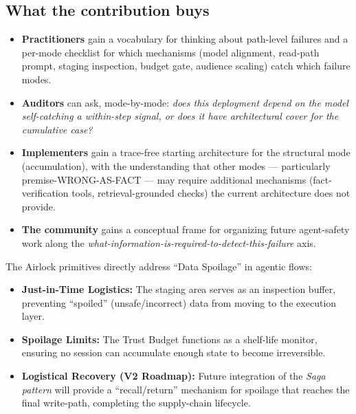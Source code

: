 \documentclass[11pt]{article}
\begin{document}
\subsection{What the contribution buys}

\begin{itemize}[leftmargin=*]
\item \textbf{Practitioners} gain a vocabulary for thinking about path-level failures and a per-mode checklist for which mechanisms (model alignment, read-path prompt, staging inspection, budget gate, audience scaling) catch which failure modes.
\item \textbf{Auditors} can ask, mode-by-mode: \emph{does this deployment depend on the model self-catching a within-step signal, or does it have architectural cover for the cumulative case?}
\item \textbf{Implementers} gain a trace-free starting architecture for the structural mode (accumulation), with the understanding that other modes --- particularly premise-WRONG-AS-FACT --- may require additional mechanisms (fact-verification tools, retrieval-grounded checks) the current architecture does not provide.
\item \textbf{The community} gains a conceptual frame for organizing future agent-safety work along the \emph{what-information-is-required-to-detect-this-failure} axis.
\end{itemize}

The Airlock primitives directly address ``Data Spoilage'' in agentic flows:

\begin{itemize}[leftmargin=*]
\item \textbf{Just-in-Time Logistics:} The staging area serves as an inspection buffer, preventing ``spoiled'' (unsafe/incorrect) data from moving to the execution layer.
\item \textbf{Spoilage Limits:} The Trust Budget functions as a shelf-life monitor, ensuring no session can accumulate enough state to become irreversible.
\item \textbf{Logistical Recovery (V2 Roadmap):} Future integration of the \emph{Saga pattern} will provide a ``recall/return'' mechanism for spoilage that reaches the final write-path, completing the supply-chain lifecycle.
\end{itemize}
\end{document}
